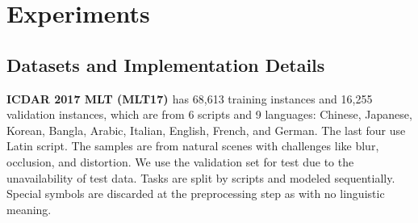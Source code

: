 \documentclass[10pt,twocolumn,letterpaper]{article}
\begin{document}
\section{Experiments}
\subsection{Datasets and Implementation Details} \label{DID}


\noindent\textbf{ICDAR 2017 MLT (MLT17) \cite{nayef2017mlt2017}}
has 68,613 training instances and 16,255 validation instances, which are from 6 scripts and 9 languages: Chinese, Japanese, Korean, Bangla, Arabic, Italian, English, French, and German. The last four use Latin script. The samples are from natural scenes with challenges like blur, occlusion, and distortion. We use the validation set for test due to the unavailability of test data. Tasks are split by scripts and modeled sequentially. Special symbols are discarded at the preprocessing step as with no linguistic meaning.
\end{document}
